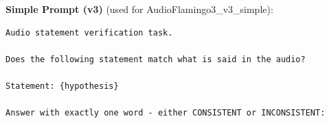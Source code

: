 \noindent \textbf{Simple Prompt (v3)} (used for AudioFlamingo3\_v3\_simple):
\begin{verbatim}
Audio statement verification task.

Does the following statement match what is said in the audio?

Statement: {hypothesis}

Answer with exactly one word - either CONSISTENT or INCONSISTENT:
\end{verbatim}
